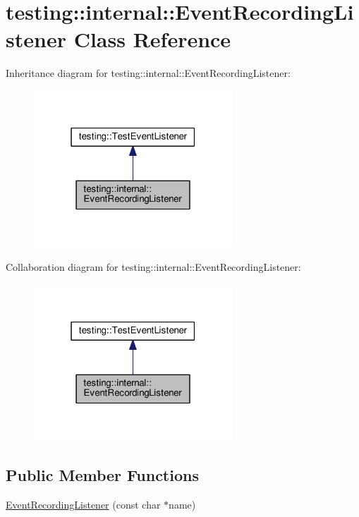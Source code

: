 \hypertarget{classtesting_1_1internal_1_1EventRecordingListener}{}\section{testing\+:\+:internal\+:\+:Event\+Recording\+Listener Class Reference}
\label{classtesting_1_1internal_1_1EventRecordingListener}


Inheritance diagram for testing\+:\+:internal\+:\+:Event\+Recording\+Listener\+:
\nopagebreak
\begin{figure}[H]
\begin{center}
\leavevmode
\includegraphics[width=211pt]{classtesting_1_1internal_1_1EventRecordingListener__inherit__graph}
\end{center}
\end{figure}


Collaboration diagram for testing\+:\+:internal\+:\+:Event\+Recording\+Listener\+:
\nopagebreak
\begin{figure}[H]
\begin{center}
\leavevmode
\includegraphics[width=211pt]{classtesting_1_1internal_1_1EventRecordingListener__coll__graph}
\end{center}
\end{figure}
\subsection*{Public Member Functions}
\begin{DoxyCompactItemize}
\item 
\hyperlink{classtesting_1_1internal_1_1EventRecordingListener_a7b0254c15d6b8468e1441ee572fee707}{Event\+Recording\+Listener} (const char $\ast$name)
\end{DoxyCompactItemize}

